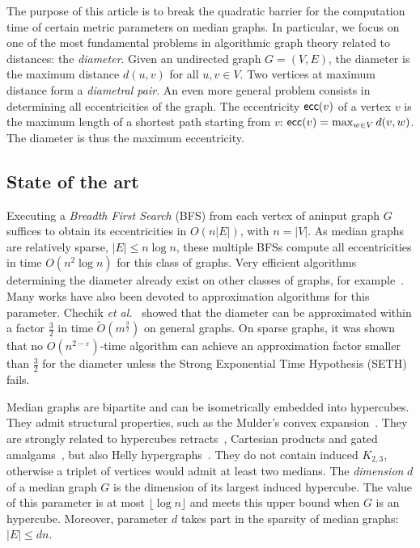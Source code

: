 \documentclass[a4paper,UKenglish,numberwithinsect,cleveref, autoref,anonymous]{lipics-v2021}
\newcommand{\card}[1]{\left| #1 \right|}
\newcommand{\ecc}{\mbox{\textsf{ecc}}}
\begin{document}
The purpose of this article is to break the quadratic barrier for the computation time of certain metric parameters on median graphs. In particular, we focus on one of the most fundamental problems in algorithmic graph theory related to distances: the \textit{diameter}. Given an undirected graph $G=(V,E)$, the diameter is the maximum distance $d(u,v)$ for all $u,v \in V$. Two vertices at maximum distance form a \textit{diametral pair}. An even more general problem consists in determining all eccentricities of the graph. The eccentricity $\ecc(v)$ of a vertex $v$ is the maximum length of a shortest path starting from $v$: $\ecc(v) = \max_{w \in V} d(v,w)$. The diameter is thus the maximum eccentricity.

\subsection{State of the art}

Executing a \textit{Breadth First Search} (BFS) from each vertex of aninput graph $G$ suffices to obtain its eccentricities in $O(n\card{E})$, with $n = \card{V}$. As median graphs are relatively sparse, $\card{E} \le n\log n$, these multiple BFSs compute all eccentricities in time $O(n^2\log n)$ for this class of graphs.
Very efficient algorithms determining the diameter already exist on other classes of graphs, for example~\cite{AbWiWa16,Ca17,DuHaVi20}. Many works have also been devoted to approximation algorithms for this parameter. Chechik {\em et al.}~\cite{ChLaRoScTaWi14} showed that the diameter can be approximated within a factor $\frac{3}{2}$ in time $\tilde{O}(m^{\frac{3}{2}})$ on general graphs. On sparse graphs, it was shown~\cite{RoWi13} that no $O(n^{2-\varepsilon})$-time algorithm can achieve an approximation factor smaller than $\frac{3}{2}$ for the diameter unless the Strong Exponential Time Hypothesis (SETH) fails.

Median graphs are bipartite and can be isometrically embedded into hypercubes. They admit structural properties, such as the Mulder's convex expansion~\cite{Mu78,Mu80}. They are strongly related to hypercubes retracts~\cite{Ba84}, Cartesian products and gated amalgams~\cite{BaCh08}, but also Helly hypergraphs~\cite{MuSc79}. They do not contain induced $K_{2,3}$, otherwise a triplet of vertices would admit at least two medians. The \textit{dimension} $d$ of a median graph $G$ is the dimension of its largest induced hypercube. The value of this parameter is at most $\lfloor \log n \rfloor$ and meets this upper bound when $G$ is an hypercube. Moreover, parameter $d$ takes part in the sparsity of median graphs: $\card{E} \le dn$.
\end{document}
